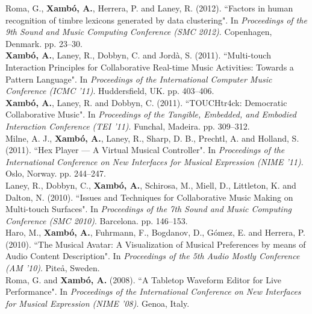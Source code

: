 \documentclass[10pt, a4paper]{article}
\newcommand{\years}[1]{\marginnote{\scriptsize #1}}
\begin{document}
\years{2012}Roma, G., \textbf{Xambó, A.}, Herrera, P. and Laney, R. (2012). “Factors in human recognition of timbre lexicons generated by data clustering". In \emph{Proceedings of the 9th Sound and Music Computing Conference (SMC 2012)}. Copenhagen, Denmark. pp. 23--30.\\
\years{2011c}\textbf{Xambó, A.}, Laney, R., Dobbyn, C. and Jordà, S. (2011). “Multi-touch Interaction Principles for Collaborative Real-time Music Activities: Towards a Pattern Language". In \emph{Proceedings of the International Computer Music Conference (ICMC '11)}. Huddersfield, UK. pp. 403--406.\\
\years{2011b}\textbf{Xambó, A.}, Laney, R. and Dobbyn, C. (2011). “TOUCHtr4ck: Democratic Collaborative Music". In \emph{Proceedings of the Tangible, Embedded, and Embodied Interaction Conference (TEI '11)}. Funchal, Madeira. pp. 309--312.\\
\years{2011a}Milne, A. J., \textbf{Xambó, A.}, Laney, R., Sharp, D. B., Prechtl, A. and Holland, S. (2011). “Hex Player — A Virtual Musical Controller". In \emph{Proceedings of the International Conference on New Interfaces for Musical Expression (NIME '11)}. Oslo, Norway. pp. 244--247.\\
\years{2010b}Laney, R., Dobbyn, C., \textbf{Xambó, A.}, Schirosa, M., Miell, D., Littleton, K. and Dalton, N. (2010). “Issues and Techniques for Collaborative Music Making on Multi-touch Surfaces". In \emph{Proceedings of the 7th Sound and Music Computing Conference (SMC 2010)}. Barcelona. pp. 146–153.\\
\years{2010a}Haro, M., \textbf{Xambó, A.}, Fuhrmann, F., Bogdanov, D., Gómez, E. and Herrera, P. (2010). “The Musical Avatar: A Visualization of Musical Preferences by means of Audio Content Description". In \emph{Proceedings of the 5th Audio Mostly Conference (AM '10)}. Piteå, Sweden.\\
\years{2008}Roma, G. and \textbf{Xambó, A.} (2008). “A Tabletop Waveform Editor for Live Performance". In \emph{Proceedings of the International Conference on New Interfaces for Musical Expression (NIME '08)}. Genoa, Italy.
\end{document}
